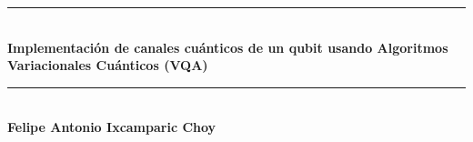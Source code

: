 \documentclass[11pt, spanish, letterpage]{article} %
\date{}
\begin{document}
\begin{titlepage} %
\newcommand{\HRule}{\rule{\linewidth}{0.5mm}} %

\center %

	
\HRule\\[0.6cm]

{\huge\bfseries Implementación de canales cuánticos de un qubit usando Algoritmos Variacionales Cuánticos (VQA) }\\[0.5cm] %

\HRule\\[2cm]



\Large{\textbf{Felipe Antonio Ixcamparic Choy}}\\ [2cm] %



\end{titlepage}
\end{document}
